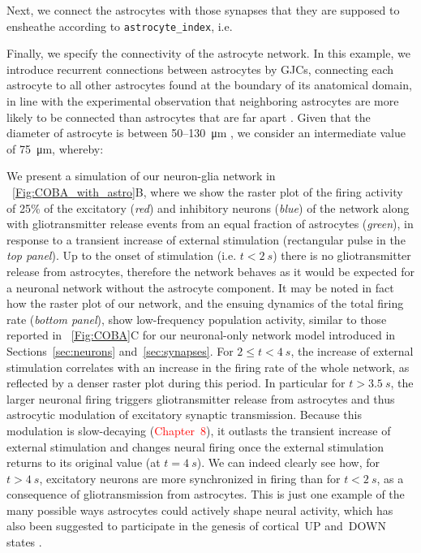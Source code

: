 \documentclass[a4paper, 11pt]{article}
\newcommand*{\figref}[1]{\figurename~\ref{#1}}
\begin{document}
Next, we connect the astrocytes with those synapses that they are supposed to ensheathe according to  \lstinline|astrocyte_index|, i.e.

Finally, we specify the connectivity of the astrocyte network.
In this example, we introduce recurrent connections between astrocytes by GJCs, connecting each astrocyte to all other astrocytes found at the boundary of its anatomical domain, in line with the experimental observation that neighboring astrocytes are more likely to be connected than astrocytes that are far apart \citep{Giaume_etal_NatureRevNeurosci2010,Pannasch_TiNS2013}.
Given that the diameter of astrocyte is between 50--130~\si{\micro m} \citep{Chao_Book2002}, we consider an intermediate value of \SI{75}{\micro m}, whereby:


We present a simulation of our neuron-glia network in \figref{Fig:COBA_with_astro}B, where we show the raster plot of the firing activity of 25\% of the excitatory (\textit{red}) and inhibitory neurons (\textit{blue}) of the network along with gliotransmitter release events from an equal fraction of astrocytes (\textit{green}), in response to a transient increase of external stimulation (rectangular pulse in the \textit{top panel}).
Up to the onset of stimulation (i.e. $t < \SI{2}{s}$) there is no gliotransmitter release from astrocytes, therefore the network behaves as it would be expected for a neuronal network without the astrocyte component.
It may be noted in fact how the raster plot of our network, and the ensuing dynamics of the total firing rate (\textit{bottom panel}), show low-frequency population activity, similar to those reported in \figref{Fig:COBA}C for our neuronal-only network model introduced in Sections~\ref{sec:neurons} and~\ref{sec:synapses}.
For $2\le t < \SI{4}{s}$, the increase of external stimulation correlates with an increase in the firing rate of the whole network, as reflected by a denser raster plot during this period.
In particular for $t > \SI{3.5}{s}$, the larger neuronal firing triggers gliotransmitter release from astrocytes and thus astrocytic modulation of excitatory synaptic transmission.
Because this modulation is slow-decaying (\textcolor{red}{Chapter~8}), it outlasts the transient increase of external stimulation and changes neural firing once the external stimulation returns to its original value (at $t=\SI{4}{s}$).
We can indeed clearly see how, for $t > \SI{4}{s}$, excitatory neurons are more synchronized in firing than for $t<\SI{2}{s}$, as a consequence of gliotransmission from astrocytes.
This is just one example of the many possible ways astrocytes could actively shape neural activity, which has also been suggested to participate in the genesis of cortical~UP and~DOWN states \citep{Fellin_FN2012}. 
\end{document}
